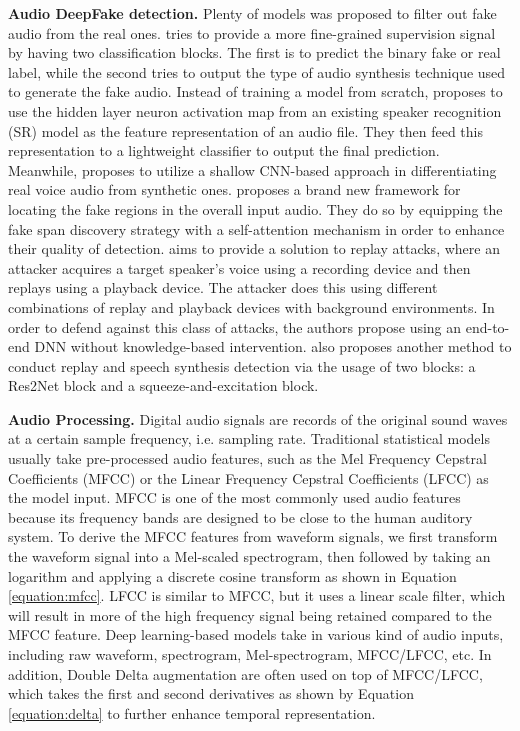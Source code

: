 \documentclass{article}
\begin{document}
\textbf{Audio DeepFake detection.}
Plenty of models was proposed to filter out fake audio from the real ones. \cite{Subra2020Learning} tries to provide a more fine-grained supervision signal by having two classification blocks. The first is to predict the binary fake or real label, while the second tries to output the type of audio synthesis technique used to generate the fake audio. Instead of training a model from scratch, \cite{Wang2020DeepSonar} proposes to use the hidden layer neuron activation map from an existing speaker recognition (SR) model as the feature representation of an audio file. They then feed this representation to a lightweight classifier to output the final prediction. Meanwhile, \cite{shallowcnn2019} proposes to utilize a shallow CNN-based approach in differentiating real voice audio from synthetic ones. \cite{Wu2022SelfAttention} proposes a brand new framework for locating the fake regions in the overall input audio. They do so by equipping the fake span discovery strategy with a self-attention mechanism in order to enhance their quality of detection. \cite{JungReplay2019} aims to provide a solution to replay attacks, where an attacker acquires a target speaker’s voice using a recording device and then replays using a playback device. The attacker does this using different combinations of replay and playback devices with background environments. In order to defend against this class of attacks, the authors propose using an end-to-end DNN without knowledge-based intervention. \cite{2020res2net} also proposes another method to conduct replay and speech synthesis detection via the usage of two blocks: a Res2Net block and a squeeze-and-excitation block.

\textbf{Audio Processing.} Digital audio signals are records of the original sound waves at a certain sample frequency, i.e. sampling rate. Traditional statistical models \cite{xu2004hmm} usually take pre-processed audio features, such as the Mel Frequency Cepstral Coefficients (MFCC) or the Linear Frequency Cepstral Coefficients (LFCC) as the model input. MFCC is one of the most commonly used audio features because its frequency bands are designed to be close to the human auditory system. To derive the MFCC features from waveform signals, we first transform the waveform signal into a Mel-scaled spectrogram, then followed by taking an logarithm and applying a discrete cosine transform as shown in Equation \ref{equation:mfcc}. LFCC is similar to MFCC, but it uses a linear scale filter, which will result in more of the high frequency signal being retained compared to the MFCC feature. Deep learning-based models take in various kind of audio inputs, including raw waveform, spectrogram, Mel-spectrogram, MFCC/LFCC, etc. In addition, Double Delta augmentation are often used on top of MFCC/LFCC, which takes the first and second derivatives as shown by Equation \ref{equation:delta} to further enhance temporal representation.
\end{document}
